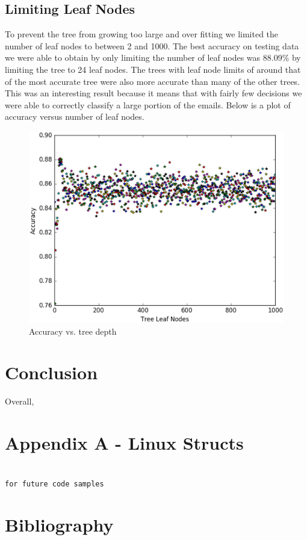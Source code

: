 \documentclass{article} %
\begin{document}
\subsection{Limiting Leaf Nodes}
To prevent the tree from growing too large and over fitting we limited the number
of leaf nodes to between 2 and 1000. The best accuracy on testing data we were
able to obtain by only limiting the number of leaf nodes was 88.09\% by limiting
the tree to 24 leaf nodes. The trees with leaf node limits of around that of
the most accurate tree were also more accurate than many of the other trees.
This was an interesting result because it means that with fairly few decisions
we were able to correctly classify a large portion of the emails. Below is a
plot of accuracy versus number of leaf nodes.
\begin{figure}[H]
\includegraphics[scale=.5]{accuracy-vs-nodes}
\caption{Accuracy vs. tree depth}
\end{figure}


\section{Conclusion}
Overall,
\clearpage
\section{Appendix A - Linux Structs}

\begin{lstlisting}

for future code samples

\end{lstlisting}

\section{Bibliography}


\end{document}
